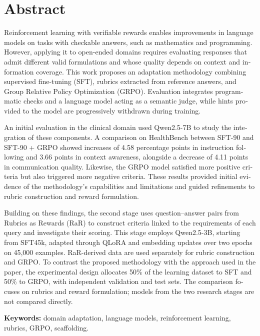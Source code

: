 \chapter*{Abstract}
\begin{otherlanguage}{english}
Reinforcement learning with verifiable rewards enables improvements in language models on tasks with checkable answers, such as mathematics and programming. However, applying it to open-ended domains requires evaluating responses that admit different valid formulations and whose quality depends on context and information coverage. This work proposes an adaptation methodology combining supervised fine-tuning (SFT), rubrics extracted from reference answers, and Group Relative Policy Optimization (GRPO). Evaluation integrates programmatic checks and a language model acting as a semantic judge, while hints provided to the model are progressively withdrawn during training.

An initial evaluation in the clinical domain used Qwen2.5-7B to study the integration of these components. A comparison on HealthBench between SFT-90 and SFT-90 + GRPO showed increases of 4.58 percentage points in instruction following and 3.66 points in context awareness, alongside a decrease of 4.11 points in communication quality. Likewise, the GRPO model satisfied more positive criteria but also triggered more negative criteria. These results provided initial evidence of the methodology's capabilities and limitations and guided refinements to rubric construction and reward formulation.

Building on these findings, the second stage uses question--answer pairs from Rubrics as Rewards (RaR) to construct criteria linked to the requirements of each query and investigate their scoring. This stage employs Qwen2.5-3B, starting from SFT45k, adapted through QLoRA and embedding updates over two epochs on 45,000 examples. RaR-derived data are used separately for rubric construction and GRPO. To contrast the proposed methodology with the approach used in the paper, the experimental design allocates 50\% of the learning dataset to SFT and 50\% to GRPO, with independent validation and test sets. The comparison focuses on rubrics and reward formulation; models from the two research stages are not compared directly.

\bigskip
\noindent\textbf{Keywords:} domain adaptation, language models, reinforcement learning, rubrics, GRPO, scaffolding.
\end{otherlanguage}
\clearpage
